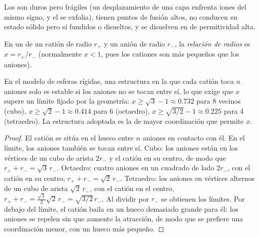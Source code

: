 \begin{proposition}\label{prop:b1:crystals-ionic-covalent:ionic-properties}
Los  son duros pero frágiles (un desplazamiento de una
capa enfrenta iones del mismo signo, y el  se exfolia), tienen
puntos de fusión altos, no conducen en estado sólido pero sí fundidos o
disueltos, y se disuelven en  de permitividad alta.
\end{proposition}
\admitted

\begin{definition}\label{def:b1:crystals-ionic-covalent:radius-ratio}
En un  de un catión de radio $r_+$ y un anión de radio
$r_-$, la \emph{relación de radios} es $x = r_+/r_-$
(normalmente $x < 1$, pues los cationes son más pequeños que los
aniones).
\end{definition}

\begin{proposition}\label{prop:b1:crystals-ionic-covalent:rule}
En el modelo de esferas rígidas, una estructura en la que cada catión toca
$n$ aniones solo es estable si los aniones no se tocan entre sí, lo que
exige que $x$ supere un límite fijado por la geometría: $x \ge \sqrt3 - 1
\approx 0.732$ para 8 vecinos (cubo), $x \ge \sqrt2 - 1 \approx 0.414$
para 6 (octaedro), $x \ge \sqrt{3/2} - 1 \approx 0.225$ para 4
(tetraedro). La estructura adoptada es la de mayor coordinación que
permite $x$.
\end{proposition}

\begin{proof}
El catión se sitúa en el hueco entre $n$ aniones en contacto con él. En
el límite, los aniones también se tocan entre sí. Cubo: los aniones están
en los vértices de un cubo de arista $2r_-$ y el catión en su centro, de
modo que $r_+ +
r_- = \sqrt3\,r_-$. Octaedro: cuatro aniones en un cuadrado de lado
$2r_-$, con el catión en su centro, $r_+ + r_- = \sqrt2\,r_-$. Tetraedro:
los aniones en vértices alternos de un cubo de arista $\sqrt2\,r_-$, con
el catión en el centro, $r_+ + r_- = \frac{\sqrt3}{2}\sqrt2\,r_- = \sqrt{3/2}\,r_-$.
Al dividir por $r_-$ se obtienen los límites. Por debajo del límite, el
catión baila en un hueco demasiado grande para él: los aniones se repelen
sin que aumente la atracción, de modo que se prefiere una coordinación
menor, con un hueco más pequeño.
\end{proof}

